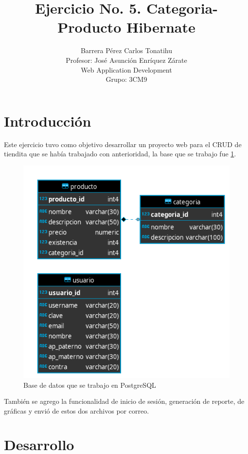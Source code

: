 \documentclass[a4paper,12pt]{article}
\title{Ejercicio No. 5. Categoria-Producto Hibernate}
\author{Barrera Pérez Carlos Tonatihu \\ Profesor: José Asunción Enríquez 
Zárate \\ Web Application Development \\ Grupo: 3CM9 }
\begin{document}
\maketitle

\newpage
\tableofcontents
\newpage
\section{Introducción}
Este ejercicio tuvo como objetivo desarrollar un proyecto web para el CRUD de 
tiendita que se había trabajado con anterioridad, la base que se 
trabajo fue \ref{fig:bd}.

\begin{figure}[H]
\begin{center}
 \includegraphics[width=\textwidth]{tiendita.png}
 \caption{Base de datos que se trabajo en PostgreSQL}
 \label{fig:bd}
\end{center}
\end{figure}

También se agrego la funcionalidad de inicio de sesión, generación de reporte, 
de gráficas y envió de estos dos archivos por correo.

\section{Desarrollo}
\end{document}
